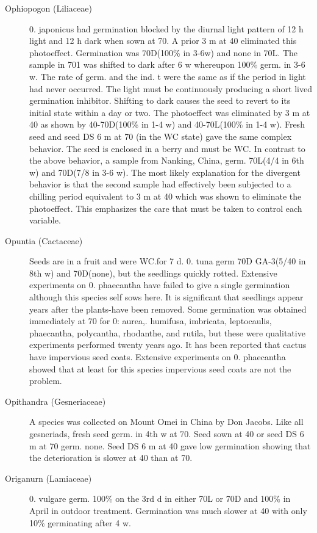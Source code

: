\begin{description}
\item[Ophiopogon (Liliaceae)] 0. japonicus had germination blocked by the
diurnal light pattern of 12 h light and 12 h dark when sown at 70. A prior 3 m at 40
eliminated this photoeffect. Germination was 70D(100\% in 3-6w) and none in 70L.
The sample in 701 was shifted to dark after 6 w whereupon 100\% germ. in 3-6 w. The
rate of germ. and the ind. t were the same as if the period in light had never occurred.
The light must be continuously producing a short lived germination inhibitor. Shifting
to dark causes the seed to revert to its initial state within a day or two. The photoeffect
was eliminated by 3 m at 40 as shown by 40-70D(100\% in 1-4 w) and 40-70L(100\% in
1-4 w). Fresh seed and seed DS 6 m at 70 (in the WC state) gave the same complex
behavior. The seed is enclosed in a berry and must be WC. In contrast to the above
behavior, a sample from Nanking, China, germ. 70L(4/4 in 6th w) and 70D(7/8 in 3-6
w). The most likely explanation for the divergent behavior is that the second sample
had effectively been subjected to a chilling period equivalent to 3 m at 40 which was
shown to eliminate the photoeffect. This emphasizes the care that must be taken to
control each variable.

\item[Opuntia (Cactaceae)] Seeds are in a fruit and were WC.for 7 d. 0. tuna
germ 70D GA-3(5/40 in 8th w) and 70D(none), but the seedlings quickly rotted.
Extensive experiments on 0. phaecantha have failed to give a single germination
although this species self sows here. It is significant that seedlings appear years after
the plants-have been removed. Some germination was obtained immediately at 70 for
0: aurea,. humifusa, imbricata, leptocaulis, phaecantha, polycantha, rhodanthe, and
rutila, but these were qualitative experiments performed twenty years ago. It has been
reported that cactus have impervious seed coats. Extensive experiments on 0.
phaecantha showed that at least for this species impervious seed coats are not the
problem.

\item[Opithandra (Gesneriaceae)] A species was collected on Mount Omei in
China by Don Jacobs. Like all gesneriads, fresh seed germ. in 4th w at 70. Seed
sown at 40 or seed DS 6 m at 70 germ. none. Seed DS 6 m at 40 gave low
germination showing that the deterioration is slower at 40 than at 70.
\item[Origanurn (Lamiaceae)] 0. vulgare germ. 100\% on the 3rd d in either 70L
or 70D and 100\% in April in outdoor treatment. Germination was much slower at 40
with only 10\% germinating after 4 w.


\end{description}
